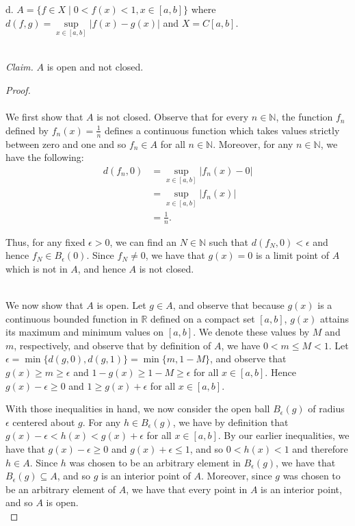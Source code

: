 \pagebreak

d.  $A = \{ f \in X \mid 0 < f(x) < 1, x \in [a, b] \}$ where $d(f, g) = \sup\limits_{x \in [a, b]}{|f(x) - g(x)|}$ and 
    $X = C[a, b]$.

\ \\
\emph{Claim.} $A$ is open and not closed. 

\begin{proof}\ \\\\
    We first show that $A$ is not closed. Observe that for every $n \in \mathbb{N}$, the function $f_n$ defined by 
    $f_n(x) = \frac{1}{n}$ defines a continuous function which takes values strictly between zero and one and so 
    $f_n \in A$ for all $n \in \mathbb{N}$. Moreover, for any $n \in \mathbb{N}$, we have the following:
    \begin{align*}
         d(f_n, 0) &= \sup\limits_{x \in [a, b]}{|f_n(x) - 0|} \\ 
                   &= \sup\limits_{x \in [a, b]}{|f_n(x)|} \\ 
                   &= \frac{1}{n}.
    \end{align*}

    Thus, for any fixed $\epsilon > 0$, we can find an $N \in \mathbb{N}$ such that $d(f_N, 0) < \epsilon$ and hence
    $f_N \in B_\epsilon(0)$. Since $f_N \neq 0$, we have that $g(x) = 0$ is a limit point of $A$ which is not in $A$, 
    and hence $A$ is not closed.

    \ \\
    We now show that $A$ is open. Let $g \in A$, and observe that because $g(x)$ is a continuous bounded function
    in $\mathbb{R}$ defined on a compact set $[a, b]$, $g(x)$ attains its maximum and minimum values on $[a, b]$. We 
    denote these values by $M$ and $m$, respectively, and observe that by definition of $A$, we have $0 < m \le M < 1$. 
    Let $\epsilon = \min{\{ d(g, 0), d(g, 1) \}} = \min{\{ m, 1 - M \}}$, and observe that $g(x) \ge m \ge \epsilon$ and 
    $1 - g(x) \ge 1 - M \ge \epsilon$ for all $x \in [a, b]$. Hence $g(x) - \epsilon \ge 0$ and $1 \ge g(x) + \epsilon$
    for all $x \in [a, b]$.

    With those inequalities in hand, we now consider the open ball $B_\epsilon(g)$ of
    radius $\epsilon$ centered about $g$. For any $h \in B_\epsilon(g)$, we have by definition that 
    $g(x) - \epsilon < h(x) < g(x) + \epsilon$ for all $x \in [a, b]$. By our earlier inequalities, we have that 
    $g(x) - \epsilon \ge 0$ and $g(x) + \epsilon \le 1$, and so $0 < h(x) < 1$ and therefore $h \in A$. Since $h$ was
    chosen to be an arbitrary element in $B_\epsilon(g)$, we have that $B_\epsilon(g) \subseteq A$, and so $g$ is an 
    interior point of $A$. Moreover, since $g$ was chosen to be an arbitrary element of $A$, we have that every point in
    $A$ is an interior point, and so $A$ is open.
    \ \\
\end{proof}

